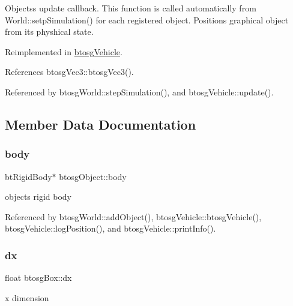 Objects\textquotesingle{}s update callback. This function is called automatically from World\+::setp\+Simulation() for each registered object. Positions graphical object from its physhical state. 

Reimplemented in \hyperlink{classbtosgVehicle_a5fd0f471df492ac232c9b772a28bd2b9}{btosg\+Vehicle}.



References btosg\+Vec3\+::btosg\+Vec3().



Referenced by btosg\+World\+::step\+Simulation(), and btosg\+Vehicle\+::update().



\subsection{Member Data Documentation}
\mbox{\label{classbtosgObject_a64ccde0543c184ed1749fdb9c9699785}} 
\subsubsection{\texorpdfstring{body}{body}}
{\footnotesize\ttfamily bt\+Rigid\+Body$\ast$ btosg\+Object\+::body\hspace{0.3cm}{\ttfamily [inherited]}}



object\textquotesingle{}s rigid body 



Referenced by btosg\+World\+::add\+Object(), btosg\+Vehicle\+::btosg\+Vehicle(), btosg\+Vehicle\+::log\+Position(), and btosg\+Vehicle\+::print\+Info().

\mbox{\label{classbtosgBox_a1d1e4744d9e377e1462ea097dacef716}} 
\subsubsection{\texorpdfstring{dx}{dx}}
{\footnotesize\ttfamily float btosg\+Box\+::dx}



x dimension 

\mbox{\label{classbtosgBox_a7665337187adb52a1ce3b4cf2819217d}} 
